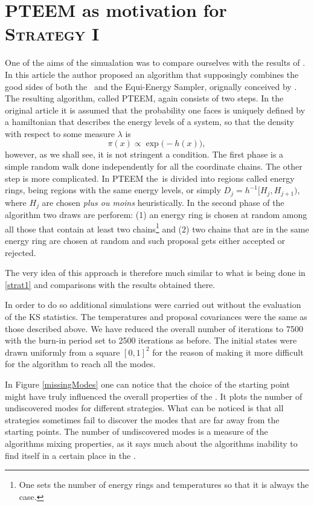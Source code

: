 \section{PTEEM as motivation for \textsc{Strategy I}}

One of the aims of the simualation was to compare ourselves with the results of \cite{BaragattiLikelihoodFreeParallelTempering}. In this article the author proposed an algorithm that supposingly combines the good sides of both the \PT\, and the Equi-Energy Sampler, orignally conceived by \cite{ Kuo2006}. The resulting algorithm, called PTEEM, again consists of two steps. In the original article it is assumed that the probability one faces is uniquely defined by a hamiltonian that describes the energy levels of a system, so that the density with respect to some measure $\lambda$ is
$$
	\pi(x) \propto \exp\Big(-h(x)\Big),
$$
however, as we shall see, it is not stringent a condition. The first phase is a simple random walk done independently for all the coordinate chains. The other step is more complicated. In PTEEM the \sspace\,is divided into regions called energy rings, being regions with the same energy levels, or simply $D_j = h^{-1}[H_j, H_{j+1})$, where $H_j$ are chosen {\it plus ou moins} heuristically. In the second phase of the algorithm two draws are perforem: (1) an energy ring is chosen at random among all those that contain at least two chains\footnote{One sets the number of energy rings and temperatures so that it is always the case.} and (2) two chains that are in the same energy ring are chosen at random and such proposal gets either accepted or rejected. 

The very idea of this approach is therefore much similar to what is being done in \ref{strat1} and comparisons with the results obtained there.      

In order to do so additional simulations were carried out without the evaluation of the \textsc{KS} statistics. The temperatures and proposal covariances were the same as those described above. We have reduced the overall number of iterations to 7500 with the burn-in period set to 2500 iterations as before. The initial states were drawn uniformly from a square $[0,1]^2$ for the reason of making it more difficult for the algorithm to reach all the modes.  

In Figure \ref{missingModes} one can notice that the choice of the starting point might have truly influenced the overall properties of the \PT. It plots the number of undiscovered modes for different strategies. What can be noticed is that all strategies sometimes fail to discover the modes that are far away from the starting points. The number of undiscovered modes is a measure of the algorithms mixing properties, as it says much about the algorithms inability to find itself in a certain place in the \sspace. 

